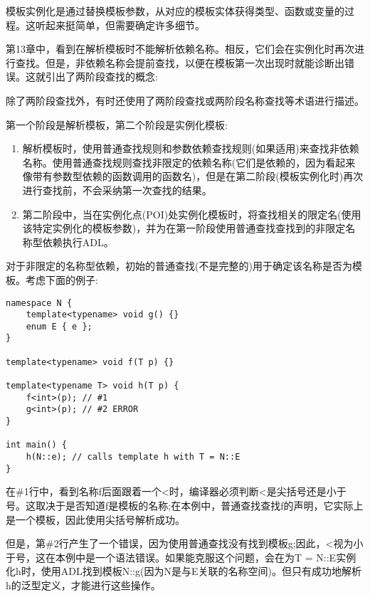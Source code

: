 
模板实例化是通过替换模板参数，从对应的模板实体获得类型、函数或变量的过程。这听起来挺简单，但需要确定许多细节。


第13章中，看到在解析模板时不能解析依赖名称。相反，它们会在实例化时再次进行查找。但是，非依赖名称会提前查找，以便在模板第一次出现时就能诊断出错误。这就引出了两阶段查找的概念:

\begin{tcolorbox}[colback=webgreen!5!white,colframe=webgreen!75!black]
\hspace*{0.75cm}除了两阶段查找外，有时还使用了两阶段查找或两阶段名称查找等术语进行描述。
\end{tcolorbox}

第一个阶段是解析模板，第二个阶段是实例化模板:

\begin{enumerate}
\item 
解析模板时，使用普通查找规则和参数依赖查找规则(如果适用)来查找非依赖名称。使用普通查找规则查找非限定的依赖名称(它们是依赖的，因为看起来像带有参数型依赖的函数调用的函数名)，但是在第二阶段(模板实例化时)再次进行查找前，不会采纳第一次查找的结果。

\item 
第二阶段中，当在实例化点(POI)处实例化模板时，将查找相关的限定名(使用该特定实例化的模板参数)，并为在第一阶段使用普通查找查找到的非限定名称型依赖执行ADL。
\end{enumerate}

对于非限定的名称型依赖，初始的普通查找(不是完整的)用于确定该名称是否为模板。考虑下面的例子:

\begin{lstlisting}[style=styleCXX]
namespace N {
	template<typename> void g() {}
	enum E { e };
}

template<typename> void f(T p) {}

template<typename T> void h(T p) {
	f<int>(p); // #1
	g<int>(p); // #2 ERROR
}

int main() {
	h(N::e); // calls template h with T = N::E
}
\end{lstlisting}

在\#1行中，看到名称f后面跟着一个<时，编译器必须判断<是尖括号还是小于号。这取决于是否知道f是模板的名称;在本例中，普通查找查找f的声明，它实际上是一个模板，因此使用尖括号解析成功。

但是，第\#2行产生了一个错误，因为使用普通查找没有找到模板g;因此，<视为小于号，这在本例中是一个语法错误。如果能克服这个问题，会在为T = N::E实例化h时，使用ADL找到模板N::g(因为N是与E关联的名称空间)。但只有成功地解析h的泛型定义，才能进行这些操作。


